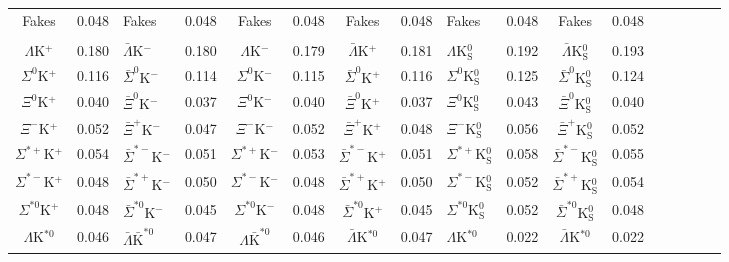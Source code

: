 \documentclass[/home/jesse/Analysis/FemtoAnalysis/AnalysisNotes/AnalysisNoteJBuxton.tex]{subfiles}
\begin{document}
\begin{landscape}
\begin{table}[htbp]
{\begin{tabular}{|c|cV{5.0}c|cV{5.0}c|cV{5.0}c|cV{5.0}c|cV{5.0}c|c|}
  Fakes & 0.048 & Fakes & 0.048 & Fakes & 0.048 & Fakes & 0.048 & Fakes & 0.048 & Fakes & 0.048 \\
  
   \\
  $\Lambda$K$^{+}$ & 0.180 & $\bar{\Lambda}$K$^{-}$ & 0.180 & $\Lambda$K$^{-}$ & 0.179 & $\bar{\Lambda}$K$^{+}$ & 0.181 & $\Lambda$K$^{0}_{\mathrm{S}}$ & 0.192 & $\bar{\Lambda}$K$^{0}_{\mathrm{S}}$ & 0.193 \\
  
  $\Sigma^{0}$K$^{+}$ & 0.116 & $\bar{\Sigma}^{0}$K$^{-}$ & 0.114 & $\Sigma^{0}$K$^{-}$ & 0.115 & $\bar{\Sigma}^{0}$K$^{+}$ & 0.116 & $\Sigma^{0}$K$^{0}_{\mathrm{S}}$ & 0.125 & $\bar{\Sigma}^{0}$K$^{0}_{\mathrm{S}}$ & 0.124 \\
  
  $\Xi^{0}$K$^{+}$ & 0.040 & $\bar{\Xi}^{0}$K$^{-}$ & 0.037 & $\Xi^{0}$K$^{-}$ & 0.040 & $\bar{\Xi}^{0}$K$^{+}$ & 0.037 & $\Xi^{0}$K$^{0}_{\mathrm{S}}$ & 0.043 & $\bar{\Xi}^{0}$K$^{0}_{\mathrm{S}}$ & 0.040 \\
  
  $\Xi^{-}$K$^{+}$ & 0.052 & $\bar{\Xi}^{+}$K$^{-}$ & 0.047 & $\Xi^{-}$K$^{-}$ & 0.052 & $\bar{\Xi}^{+}$K$^{+}$ & 0.048 & $\Xi^{-}$K$^{0}_{\mathrm{S}}$ & 0.056 & $\bar{\Xi}^{+}$K$^{0}_{\mathrm{S}}$ & 0.052 \\
  
  $\Sigma^{*+}$K$^{+}$ & 0.054 & $\bar{\Sigma}^{*-}$K$^{-}$ & 0.051 & $\Sigma^{*+}$K$^{-}$ & 0.053 & $\bar{\Sigma}^{*-}$K$^{+}$ & 0.051 & $\Sigma^{*+}$K$^{0}_{\mathrm{S}}$ & 0.058 & $\bar{\Sigma}^{*-}$K$^{0}_{\mathrm{S}}$ & 0.055 \\
  
  $\Sigma^{*-}$K$^{+}$ & 0.048 & $\bar{\Sigma}^{*+}$K$^{-}$ & 0.050 & $\Sigma^{*-}$K$^{-}$ & 0.048 & $\bar{\Sigma}^{*+}$K$^{+}$ & 0.050 & $\Sigma^{*-}$K$^{0}_{\mathrm{S}}$ & 0.052 & $\bar{\Sigma}^{*+}$K$^{0}_{\mathrm{S}}$ & 0.054 \\
  
  $\Sigma^{*0}$K$^{+}$ & 0.048 & $\bar{\Sigma}^{*0}$K$^{-}$ & 0.045 & $\Sigma^{*0}$K$^{-}$ & 0.048 & $\bar{\Sigma}^{*0}$K$^{+}$ & 0.045 & $\Sigma^{*0}$K$^{0}_{\mathrm{S}}$ & 0.052 & $\bar{\Sigma}^{*0}$K$^{0}_{\mathrm{S}}$ & 0.048 \\
  
  $\Lambda$K$^{*0}$ & 0.046 & $\bar{\Lambda}\bar{\mathrm{K}}^{*0}$ & 0.047 & $\Lambda\bar{\mathrm{K}}^{*0}$ & 0.046 & $\bar{\Lambda}$K$^{*0}$ & 0.047 & $\Lambda$K$^{*0}$ & 0.022 & $\bar{\Lambda}$K$^{*0}$ & 0.022 \\
  

\end{tabular}}
\end{table}
\end{landscape}
\end{document}
